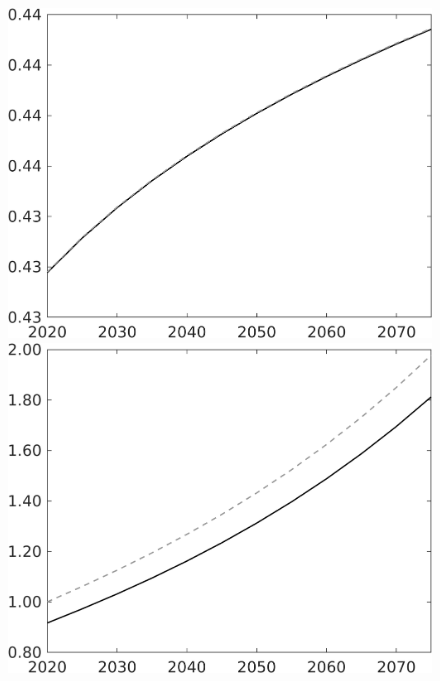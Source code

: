 \documentclass[12pt]{article}
\begin{document}
\begin{figure}[h!!]
\begin{minipage}[]{0.32\textwidth}
	\end{minipage}
	\begin{minipage}[]{0.32\textwidth}
		\includegraphics[width=1\textwidth]{../../codding_model/own_basedOnFried/optimalPol_010922_revision/figures/all_13Sept22/CompTaul_Equlab_LFBAU_Reg0_EY_spillover0_nsk0_xgr1_knspil0_sep1_countec0_GovRev0_etaa0.79_lgd0.png}
	\end{minipage}	
	\begin{minipage}[]{0.32\textwidth}
		\includegraphics[width=1\textwidth]{../../codding_model/own_basedOnFried/optimalPol_010922_revision/figures/all_13Sept22/CompTaul_Equlab_LFBAU_Reg0_N_spillover0_nsk0_xgr1_knspil0_sep1_countec0_GovRev0_etaa0.79_lgd0.png}

\end{minipage}
\end{figure}
\end{document}
